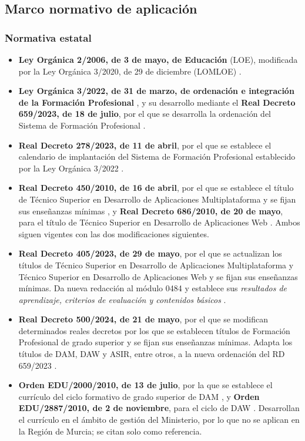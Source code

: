 \documentclass[11pt,a4paper]{article}
\begin{document}
\subsection{Marco normativo de aplicación}

\subsubsection{Normativa estatal}

\begin{itemize}
  \item \textbf{Ley Orgánica 2/2006, de 3 de mayo, de Educación} (LOE), modificada por la
        Ley Orgánica 3/2020, de 29 de diciembre (LOMLOE) \cite{loe,lomloe}.
  \item \textbf{Ley Orgánica 3/2022, de 31 de marzo, de ordenación e integración de la
        Formación Profesional} \cite{lofp}, y su desarrollo mediante el
        \textbf{Real Decreto 659/2023, de 18 de julio}, por el que se desarrolla la
        ordenación del Sistema de Formación Profesional \cite{rd659}.
  \item \textbf{Real Decreto 278/2023, de 11 de abril}, por el que se establece el calendario
        de implantación del Sistema de Formación Profesional establecido por la Ley Orgánica
        3/2022 \cite{rd278}.
  \item \textbf{Real Decreto 450/2010, de 16 de abril}, por el que se establece el título
        de Técnico Superior en Desarrollo de Aplicaciones Multiplataforma y se fijan sus
        enseñanzas mínimas \cite{rd450}, y \textbf{Real Decreto 686/2010, de 20 de
        mayo}, para el título de Técnico Superior en Desarrollo de Aplicaciones Web
        \cite{rd686}. Ambos siguen vigentes con las dos modificaciones siguientes.
  \item \textbf{Real Decreto 405/2023, de 29 de mayo}, por el que se actualizan los títulos
        de Técnico Superior en Desarrollo de Aplicaciones Multiplataforma y Técnico Superior
        en Desarrollo de Aplicaciones Web y se fijan sus enseñanzas mínimas. Da nueva
        redacción al módulo 0484 y establece sus \emph{resultados de aprendizaje, criterios
        de evaluación y contenidos básicos} \cite{rd405}.
  \item \textbf{Real Decreto 500/2024, de 21 de mayo}, por el que se modifican determinados
        reales decretos por los que se establecen títulos de Formación Profesional de grado
        superior y se fijan sus enseñanzas mínimas. Adapta los títulos de DAM, DAW y ASIR,
        entre otros, a la nueva ordenación del RD 659/2023 \cite{rd500}.
  \item \textbf{Orden EDU/2000/2010, de 13 de julio}, por la que se establece el currículo
        del ciclo formativo de grado superior de DAM \cite{ordenDAM}, y
        \textbf{Orden EDU/2887/2010, de 2 de noviembre}, para el ciclo de DAW
        \cite{ordenDAW}. Desarrollan el currículo en el ámbito de gestión del Ministerio,
        por lo que no se aplican en la Región de Murcia; se citan solo como referencia.
\end{itemize}
\end{document}
